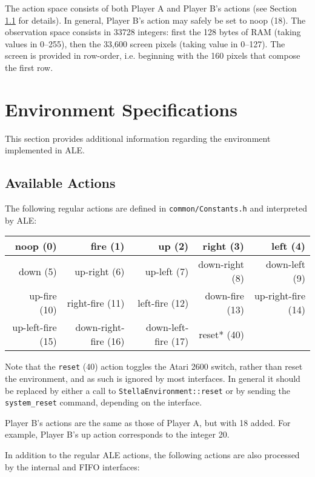 \documentclass[12pt]{article}
\begin{document}
The action space consists of both Player A and Player B's actions (see Section 
\ref{sec:available_actions}
for details). In general, Player B's action may safely be set to noop (18). The observation
space consists in 33728 integers: first the 128 bytes of RAM (taking values in 0--255), then the 
33,600 screen pixels (taking value in 0--127). The screen is provided in row-order, i.e. beginning
with the 160 pixels that compose the first row.

\section{Environment Specifications}\label{sec:environment_specifications}

This section provides additional information regarding the environment implemented in ALE.

\subsection{Available Actions}\label{sec:available_actions}

The following regular actions are defined in \verb+common/Constants.h+ and interpreted by ALE:

\begin{center}
\begin{tabular}{|r|r|r|r|r|}
\hline
noop (0) & fire (1) & up (2) & right (3) & left (4) \\
\hline
down (5) & up-right (6) & up-left (7) & down-right (8) & down-left (9) \\
\hline
up-fire (10) & right-fire (11) & left-fire (12) & down-fire (13) & up-right-fire (14) \\
\hline
up-left-fire (15) & down-right-fire (16) & down-left-fire (17) & reset* (40) & \\
\hline
\end{tabular}
\end{center}

Note that the \verb+reset+ (40) action toggles the Atari 2600 switch, rather than reset the 
environment, and as such is ignored by most interfaces.
In general it should be replaced by either a call to \verb+StellaEnvironment::reset+ or by
sending the \verb+system_reset+ command, depending on the interface. 

Player B's actions are the same as those of Player A, but with 18 added. For example, Player B's
up action corresponds to the integer 20.

In addition to the regular ALE actions, the following actions are also processed by the 
internal and FIFO interfaces:
\end{document}
